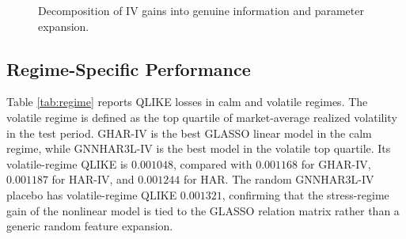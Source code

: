 \documentclass[11pt,a4paper]{article}
\begin{document}
\begin{table}[t]
\centering
\caption{IV information decomposition based on QLIKE}
\label{tab:ivdecomp}
\small
{}
\end{table}

\begin{figure}[t]
\centering
{}
\caption{Decomposition of IV gains into genuine information and parameter expansion.}
\label{fig:ivdecomp}
\end{figure}
\FloatBarrier

\subsection{Regime-Specific Performance}

Table \ref{tab:regime} reports QLIKE losses in calm and volatile regimes. The volatile regime is
defined as the top quartile of market-average realized volatility in the test period. GHAR-IV is
the best GLASSO linear model in the calm regime, while GNNHAR3L-IV is the best model in the
volatile top quartile. Its volatile-regime QLIKE is \(0.001048\), compared with
\(0.001168\) for GHAR-IV, \(0.001187\) for HAR-IV, and \(0.001244\) for HAR. The random
GNNHAR3L-IV placebo has volatile-regime QLIKE \(0.001321\), confirming that the stress-regime
gain of the nonlinear model is tied to the GLASSO relation matrix rather than a generic random
feature expansion.
\end{document}
